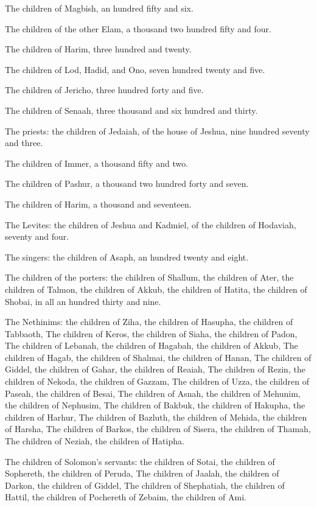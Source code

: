 \verse The children of Magbish, an hundred fifty and six.

\verse The children of the other Elam, a thousand two hundred fifty and four.

\verse The children of Harim, three hundred and twenty.

\verse The children of Lod, Hadid, and Ono, seven hundred twenty and five.

\verse The children of Jericho, three hundred forty and five.

\verse The children of Senaah, three thousand and six hundred and thirty.

\verse The priests: the children of Jedaiah, of the house of Jeshua, nine hundred seventy and three.

\verse The children of Immer, a thousand fifty and two.

\verse The children of Pashur, a thousand two hundred forty and seven.

\verse The children of Harim, a thousand and seventeen.

\verse The Levites: the children of Jeshua and Kadmiel, of the children of Hodaviah, seventy and four.

\verse The singers: the children of Asaph, an hundred twenty and eight.

\verse The children of the porters: the children of Shallum, the children of Ater, the children of Talmon, the children of Akkub, the children of Hatita, the children of Shobai, in all an hundred thirty and nine.

\verse The Nethinims: the children of Ziha, the children of Hasupha, the children of Tabbaoth, \verse The children of Keros, the children of Siaha, the children of Padon, \verse The children of Lebanah, the children of Hagabah, the children of Akkub, \verse The children of Hagab, the children of Shalmai, the children of Hanan, \verse The children of Giddel, the children of Gahar, the children of Reaiah, \verse The children of Rezin, the children of Nekoda, the children of Gazzam, \verse The children of Uzza, the children of Paseah, the children of Besai, \verse The children of Asnah, the children of Mehunim, the children of Nephusim, \verse The children of Bakbuk, the children of Hakupha, the children of Harhur, \verse The children of Bazluth, the children of Mehida, the children of Harsha, \verse The children of Barkos, the children of Sisera, the children of Thamah, \verse The children of Neziah, the children of Hatipha.

\verse The children of Solomon's servants: the children of Sotai, the children of Sophereth, the children of Peruda, \verse The children of Jaalah, the children of Darkon, the children of Giddel, \verse The children of Shephatiah, the children of Hattil, the children of Pochereth of Zebaim, the children of Ami.

